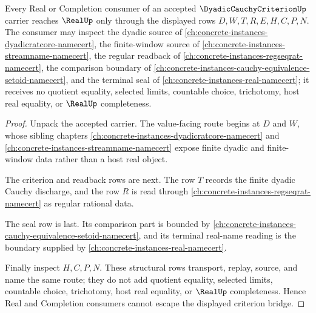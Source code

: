 \begin{theorem}
\label{thm:dyadic-cauchy-criterion-real-seal-boundary}
Every Real or Completion consumer of an accepted $\DyadicCauchyCriterionUp$ carrier reaches $\RealUp$ only through the displayed rows $D,W,T,R,E,H,C,P,N$. The consumer may inspect the dyadic source of \autoref{ch:concrete-instances-dyadicratcore-namecert}, the finite-window source of \autoref{ch:concrete-instances-streamname-namecert}, the regular readback of \autoref{ch:concrete-instances-regseqrat-namecert}, the comparison boundary of \autoref{ch:concrete-instances-cauchy-equivalence-setoid-namecert}, and the terminal seal of \autoref{ch:concrete-instances-real-namecert}; it receives no quotient equality, selected limits, countable choice, trichotomy, host real equality, or $\RealUp$ completeness.
\end{theorem}
\begin{proof}
Unpack the accepted carrier. The value-facing route begins at $D$ and $W$, whose sibling chapters \autoref{ch:concrete-instances-dyadicratcore-namecert} and \autoref{ch:concrete-instances-streamname-namecert} expose finite dyadic and finite-window data rather than a host real object.

The criterion and readback rows are next. The row $T$ records the finite dyadic Cauchy discharge, and the row $R$ is read through \autoref{ch:concrete-instances-regseqrat-namecert} as regular rational data.

The seal row is last. Its comparison part is bounded by \autoref{ch:concrete-instances-cauchy-equivalence-setoid-namecert}, and its terminal real-name reading is the boundary supplied by \autoref{ch:concrete-instances-real-namecert}.

Finally inspect $H,C,P,N$. These structural rows transport, replay, source, and name the same route; they do not add quotient equality, selected limits, countable choice, trichotomy, host real equality, or $\RealUp$ completeness. Hence Real and Completion consumers cannot escape the displayed criterion bridge.
\end{proof}


